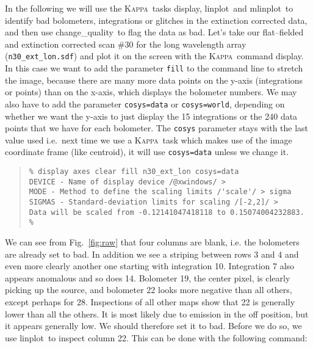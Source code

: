 \documentclass[twoside,11pt]{article}
\newenvironment{myquote}{\begin{quote}\begin{small}}{\end{small}\end{quote}}
\newcommand{\Kappa}{\xref{\textsc{Kappa}}{sun95}{}}
\newcommand{\task}[1]{\textsf{#1}}
\newcommand{\param}[1]{\texttt{#1}}
\newcommand{\chgqual}{\xref{\task{change\_\-qua\-lity}}{sun216}{CHANGE_QUALITY}}
\newcommand{\display}{\xref{\task{display}}{sun95}{DISPLAY}}
\newcommand{\linplot}{\xref{\task{linplot}}{sun95}{LINPLOT}}
\newcommand{\mlinplot}{\xref{\task{mlinplot}}{sun95}{MLINPLOT}}
\newcommand{\centroid}{\xref{\task{centroid}}{sun95}{CENTROID}}
\newcommand{\xref}[3]{#1}
\begin{document}
In the following we will use the \Kappa\ tasks \display,
\linplot\ and \mlinplot\ to identify bad bolometers, integrations
or glitches in the extinction corrected data, and then use
\chgqual\ to flag the data as bad.  Let's take our flat--fielded
and extinction corrected scan \#30 for the long wavelength array
(\texttt{n30\_ext\_lon.sdf}) and plot it on the screen with the \Kappa\ command
\display. In this case we want to add the parameter \param{fill} to
the command line to stretch the image, because there are many more data
points on the y-axis (integrations or points) than on the x-axis, which
displays the bolometer numbers. We may also have to add the parameter
\texttt{\param{cosys}=data} or \texttt{\param{cosys}=world}, depending on whether we want the
y-axis to just display the 15 integrations or the 240 data points that we have
for each bolometer.  The \param{cosys} parameter stays with the last value
used i.e.\ next time we use a \Kappa\ task which makes use of the image
coordinate frame (like \centroid), it will use \texttt{\param{cosys}=data}
unless we change it.


\begin{myquote} \begin{verbatim}
% display axes clear fill n30_ext_lon cosys=data
DEVICE - Name of display device /@xwindows/ > 
MODE - Method to define the scaling limits /'scale'/ > sigma
SIGMAS - Standard-deviation limits for scaling /[-2,2]/ > 
Data will be scaled from -0.12141047418118 to 0.15074004232883.
% 
\end{verbatim} \end{myquote}


We can see from Fig.\ \ref{fig:raw} that four columns are blank, i.e. the
bolometers are already set to bad. In addition we see a striping between rows
3 and 4 and even more clearly another one starting with integration 10.
Integration 7 also appears anomalous and so does 14. Bolometer 19, the center
pixel, is clearly picking up the source, and bolometer 22 looks more negative
than all others, except perhaps for 28. Inspections of all other maps show
that 22 is generally lower than all the others.  It is most likely due to
emission in the off position, but it appears generally low. We should
therefore set it to bad.  Before we do so, we use \linplot\ to inspect column
22.  This can be done with the following command:
\end{document}
